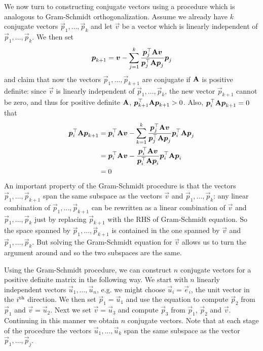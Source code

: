 We now turn to constructing conjugate vectors using a procedure which is analogous to Gram-Schmidt orthogonalization. Assume we already have $k$ conjugate vectors $\vec{p}_1,\dotsc,\vec{p}_k$ and let $\vec{v}$ be a vector which is linearly independent of $\vec{p}_1,\dotsc,\vec{p}_k$. We then set
\begin{align*}
	\boldsymbol{p}_{k+1}=\boldsymbol{v}-\sum_{j=1}^k\frac{\boldsymbol{p}_j^\top\mathbf{A}\boldsymbol{v}}{\boldsymbol{p}_j^\top\mathbf{A}\boldsymbol{p}_j}\boldsymbol{p}_j
\end{align*}
and claim that now the vectors $\vec{p}_1,\dotsc,\vec{p}_{k+1}$ are conjugate if $\mathbf{A}$ is positive definite: since $\vec{v}$ is linearly independent of $\vec{p}_1,\dotsc,\vec{p}_k$, the new vector $\vec{p}_{k+1}$ cannot be zero, and thus for positive definite $\mathbf{A}$, $\boldsymbol{p}_{k+1}^\top\mathbf{A}\boldsymbol{p}_{k+1}>0$. Also, $\boldsymbol{p}_i^\top\mathbf{A}\boldsymbol{p}_{k+1}=0$ that
\begin{align*}
	\boldsymbol{p}_i^\top\mathbf{A}\boldsymbol{p}_{k+1}&=\boldsymbol{p}_i^\top\mathbf{A}\boldsymbol{v}-\sum_{k=1}^k\frac{\boldsymbol{p}_j^\top\mathbf{A}\boldsymbol{v}}{\boldsymbol{p}_j^\top\mathbf{A}\boldsymbol{p}_j}\boldsymbol{p}_i^\top\mathbf{A}\boldsymbol{p}_j \\
	&=\boldsymbol{p}_i^\top\mathbf{A}\boldsymbol{v}-\frac{\boldsymbol{p}_i^\top\mathbf{A}\boldsymbol{v}}{\boldsymbol{p}_i^\top\mathbf{A}\boldsymbol{p}_i}\boldsymbol{p}_i^\top\mathbf{A}\boldsymbol{p}_i \\
	&=0
\end{align*}
An important property of the Gram-Schmidt procedure is that the vectors $\vec{p}_1,\dotsc,\vec{p}_{k+1}$ span the same subspace as the vectors $\vec{v}$ and $\vec{p}_1,\dotsc,\vec{p}_k$: any linear combination of $\vec{p}_1,\dotsc,\vec{p}_{k+1}$ can be rewritten as a linear combination of $\vec{v}$ and $\vec{p}_1,\dotsc,\vec{p}_k$ just by replacing $\vec{p}_{k+1}$ with the RHS of Gram-Schmidt equation. So the space spanned by $\vec{p}_1,\dotsc,\vec{p}_{k+1}$ is contained in the one spanned by $\vec{v}$ and $\vec{p}_1,\dotsc,\vec{p}_k$. But solving the Gram-Schmidt equation for $\vec{v}$ allows us to turn the argument around and so the two subspaces are the same.

Using the Gram-Schmidt procedure, we can construct $n$ conjugate vectors for a positive definite matrix in the following way. We start with $n$ linearly independent vectors $\vec{u}_1,\dotsc,\vec{u}_n$, e.g. we might choose $\vec{u}_i=\vec{e}_i$, the unit vector in the $i^\text{th}$ direction. We then set $\vec{p}_1=\vec{u}_1$ and use the equation to compute $\vec{p}_2$ from $\vec{p}_1$ and $\vec{v}=\vec{u}_2$. Next we set $\vec{v}=\vec{u}_3$ and compute $\vec{p}_3$ from $\vec{p}_1$, $\vec{p}_2$ and $\vec{v}$. Continuing in this manner we obtain $n$ conjugate vectors. Note that at each stage of the procedure the vectors $\vec{u}_1,\dotsc,\vec{u}_k$ span the same subspace as the vector $\vec{p}_1,\dotsc,\vec{p}_j$.

